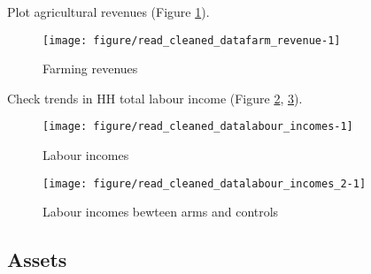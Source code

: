 Plot agricultural revenues (\textsf{\small Figure \ref{Figure farm revenue}}).
\begin{Schunk}
\begin{figure}

{\centering \texttt{[image: figure/read\_cleaned\_datafarm\_revenue-1]} 

}

\caption[Farming revenues]{Farming revenues}\label{Figure farm revenue}
\end{figure}
\end{Schunk}
Check trends in HH total labour income (\textsf{\small Figure \ref{Figure labour incomes}, \ref{Figure labour incomes 2}}).
\begin{Schunk}
\begin{figure}

{\centering \texttt{[image: figure/read\_cleaned\_datalabour\_incomes-1]} 

}

\caption[Labour incomes]{Labour incomes}\label{Figure labour incomes}
\end{figure}
\end{Schunk}
\begin{Schunk}
\begin{figure}

{\centering \texttt{[image: figure/read\_cleaned\_datalabour\_incomes\_2-1]} 

}

\caption[Labour incomes bewteen arms and controls]{Labour incomes bewteen arms and controls}\label{Figure labour incomes 2}
\end{figure}
\end{Schunk}

\subsection{Assets}


